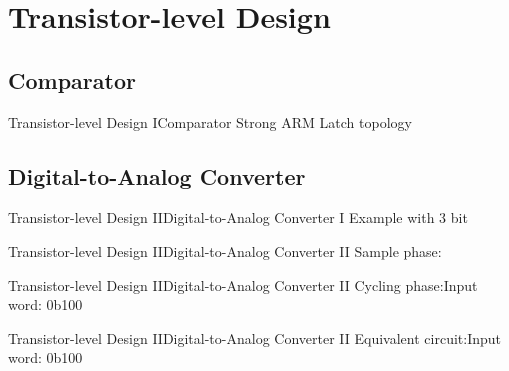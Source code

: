 \documentclass{beamer}
\begin{document}
 \section{Transistor-level Design}
 \subsection{Comparator}
 \begin{frame}{Transistor-level Design I}{Comparator}
  Strong ARM Latch topology\par\vspace{1em}
  \resizebox{\textwidth}{!}{\centering}
 \end{frame}
 \subsection{Digital-to-Analog Converter}
 \begin{frame}{Transistor-level Design II}{Digital-to-Analog Converter I}
  Example with 3 bit\vspace*{1em}
  \begin{center}
   \resizebox{\textwidth}{!}{}
  \end{center}
 \end{frame}

 \begin{frame}{Transistor-level Design II}{Digital-to-Analog Converter II}
  Sample phase:
  \vspace*{1em}
  \begin{center}
   
  \end{center}
 \end{frame}

 \begin{frame}{Transistor-level Design II}{Digital-to-Analog Converter II}
  Cycling phase:\hfill Input word: \alert{0b100}
  \vspace*{1em}
  \begin{center}
   
  \end{center}
 \end{frame}

 \begin{frame}{Transistor-level Design II}{Digital-to-Analog Converter II}
  Equivalent circuit:\hfill Input word: \alert{0b100}
  \vspace*{1em}
  \begin{center}
   
  \end{center}
 \end{frame}
\end{document}
